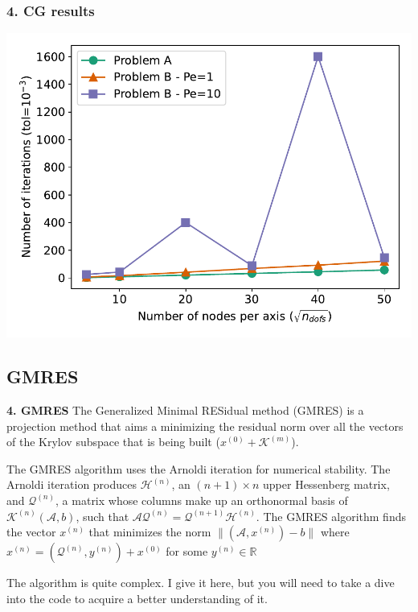 \begin{frame}
	\frametitle{\textbf{4. CG results}}
\centering
\includegraphics[width=0.95\linewidth]{images/cg_its}
\end{frame}

\subsection{GMRES}

\begin{frame}[fragile]{\textbf{4. GMRES}}
	The Generalized Minimal RESidual method (GMRES) is a projection method that aims a minimizing the residual norm over all the vectors of the Krylov subspace that is being built ($x^{(0)}+\mathcal{K}^{(m)}$).
	
	
	The GMRES algorithm uses the Arnoldi iteration for numerical stability. The Arnoldi iteration
	produces $\mathcal{H}^{(n)}$, an $(n + 1) \times n$ upper Hessenberg matrix, and $\mathcal{Q}^{(n)}$, a matrix whose columns make up an	orthonormal basis of $\mathcal{K}^{(n)}(\mathcal{A}, b)$, such that $\mathcal{A}\mathcal{Q}^{(n)} = \mathcal{Q}^{(n+1)}\mathcal{H}^{(n)}$. The GMRES algorithm finds the vector	$x^{(n)}$ that minimizes the norm $\lVert (\mathcal{A},x^{(n)}) - b \rVert$ where $x^{(n)} = (\mathcal{Q}^{(n)},y^{(n)}) + x^{(0)}$ for some $y^{(n)} \in \mathbb{R}$
	
	 The algorithm is quite complex. I  give it here, but you will need to take a dive into the code to acquire a better understanding of it.


	
\end{frame}

